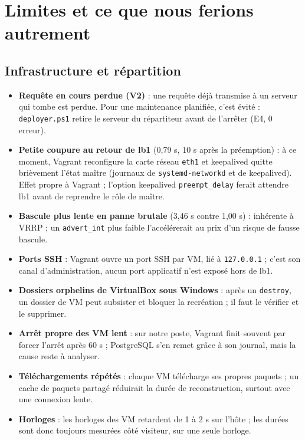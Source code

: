 \documentclass[11pt,a4paper,oneside]{report}
\newcommand{\cmd}[1]{\texttt{#1}}
\newcommand{\auteur}[1]{\par\noindent{\small\itshape Rédaction : #1}\par\medskip}
\begin{document}
	\chapter{Limites et ce que nous ferions autrement}
	
	\section{Infrastructure et répartition}
	\auteur{BANCE François Xavier}
	
	\begin{itemize}
		\item \textbf{Requête en cours perdue (V2)} : une requête déjà transmise à un serveur qui
		tombe est perdue. Pour une maintenance planifiée, c'est évité : \cmd{deployer.ps1} retire le
		serveur du répartiteur avant de l'arrêter (E4, 0 erreur).
		\item \textbf{Petite coupure au retour de lb1} (0,79 s, 10 s après la préemption) : à ce moment,
		Vagrant reconfigure la carte réseau \cmd{eth1} et keepalived quitte brièvement l'état maître
		(journaux de \cmd{systemd-networkd} et de keepalived). Effet propre à Vagrant ; l'option
		keepalived \cmd{preempt\_delay} ferait attendre lb1 avant de reprendre le rôle de maître.
		\item \textbf{Bascule plus lente en panne brutale} (3,46 s contre 1,00 s) : inhérente à VRRP ; un
		\cmd{advert\_int} plus faible l'accélérerait au prix d'un risque de fausse bascule.
		\item \textbf{Ports SSH} : Vagrant ouvre un port SSH par VM, lié à \cmd{127.0.0.1} ; c'est son
		canal d'administration, aucun port applicatif n'est exposé hors de lb1.
		\item \textbf{Dossiers orphelins de VirtualBox sous Windows} : après un \cmd{destroy}, un dossier
		de VM peut subsister et bloquer la recréation ; il faut le vérifier et le supprimer.
		\item \textbf{Arrêt propre des VM lent} : sur notre poste, Vagrant finit souvent par forcer l'arrêt
		après 60 s ; PostgreSQL s'en remet grâce à son journal, mais la cause reste à analyser.
		\item \textbf{Téléchargements répétés} : chaque VM télécharge ses propres paquets ; un cache de
		paquets partagé réduirait la durée de reconstruction, surtout avec une connexion lente.
		\item \textbf{Horloges} : les horloges des VM retardent de 1 à 2 s sur l'hôte ; les durées sont
		donc toujours mesurées côté visiteur, sur une seule horloge.
	\end{itemize}
	
\end{document}
